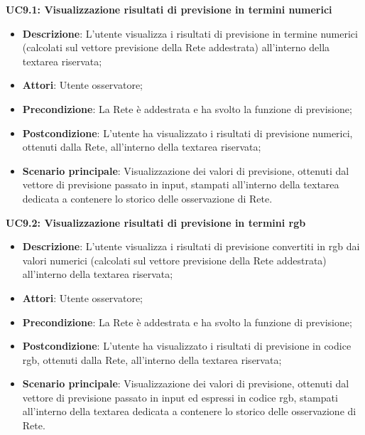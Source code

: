 \textbf{UC9.1: Visualizzazione risultati di previsione in termini numerici}\mbox{}
\label{UC9.1: Visualizzazione risultati di previsione in termini numerici}
\noindent
\begin{itemize}
\item \textbf{Descrizione}: L'utente visualizza i risultati di previsione in termine numerici (calcolati sul vettore previsione della Rete addestrata) all'interno della textarea riservata;
\item \textbf{Attori}: Utente osservatore;
\item \textbf{Precondizione}: La Rete \`e addestrata e ha svolto la funzione di previsione;
\item \textbf{Postcondizione}: L'utente ha visualizzato i risultati di previsione numerici, ottenuti dalla Rete, all'interno della textarea riservata;
\item \textbf{Scenario principale}: Visualizzazione dei valori di previsione, ottenuti dal vettore di previsione passato in input, stampati all'interno della textarea dedicata a contenere lo storico delle osservazione di Rete.
\end{itemize}

\textbf{UC9.2: Visualizzazione risultati di previsione in termini rgb}\mbox{}
\label{UC9.2: Visualizzazione risultati di previsione in termini rgb}
\noindent
\begin{itemize}
\item \textbf{Descrizione}: L'utente visualizza i risultati di previsione convertiti in rgb dai valori numerici (calcolati sul vettore previsione della Rete addestrata) all'interno della textarea riservata;
\item \textbf{Attori}: Utente osservatore;
\item \textbf{Precondizione}: La Rete \`e addestrata e ha svolto la funzione di previsione;
\item \textbf{Postcondizione}: L'utente ha visualizzato i risultati di previsione in codice rgb, ottenuti dalla Rete, all'interno della textarea riservata;
\item \textbf{Scenario principale}: Visualizzazione dei valori di previsione, ottenuti dal vettore di previsione passato in input ed espressi in codice rgb, stampati all'interno della textarea dedicata a contenere lo storico delle osservazione di Rete.
\end{itemize}

